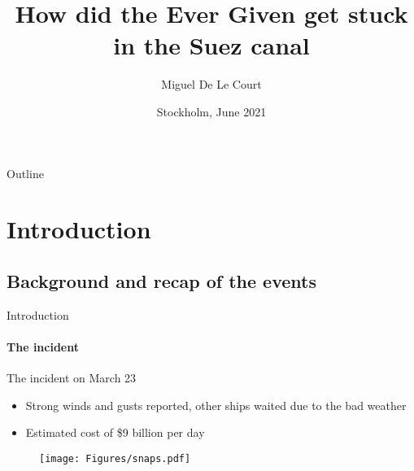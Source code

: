 \documentclass[aspectratio=169]{beamer}
\title[Short Title]{%
    \color{white} How did the Ever Given get stuck in the Suez canal
    \vspace{0.5cm}
}
\author{Miguel De Le Court}
\institute{
        \textit{Advanced Computation in Fluid Mechanics}\\
        \textit{DD2365}
        \vspace{0.5cm}
}
\date[Venue and Date]{%
   Stockholm, June 2021 
}
\begin{document}

{
    \maketitle
}

\begin{frame}{Outline}
    \small
    \tableofcontents
\end{frame}




\section{Introduction}
\subsection{Background and recap of the events}
\begin{frame}{Introduction}
    \framesubtitle{The incident}

    The incident on March 23
    \begin{itemize}
        \item Strong winds and gusts reported, other ships waited due to the bad weather\cite{wind}
        \item Estimated cost of \$9 billion per day
    \end{itemize}

    \begin{figure}
        \centering
        \texttt{[image: Figures/snaps.pdf]}
    \end{figure}
\end{frame}

\end{document}
